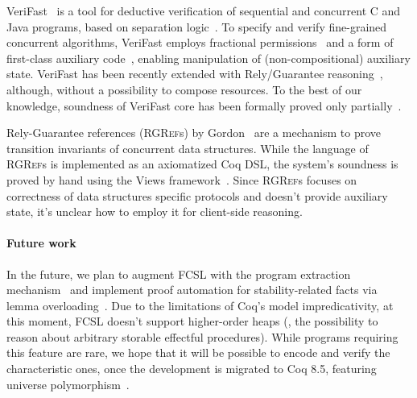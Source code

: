 VeriFast~\cite{Jacobs-al:NFM11} is a tool for deductive verification
of sequential and concurrent C and Java programs, based on separation
logic~\cite{Reynolds:LICS02}.
% 
%
To specify and verify fine-grained concurrent algorithms, VeriFast
employs fractional permissions~\cite{Bornat-al:POPL05} and a form of
first-class auxiliary code~\cite{Jacobs-Piessens:POPL11}, enabling
manipulation of (non-compositional) auxiliary state. VeriFast has been
recently extended with Rely/Guarantee
reasoning~\cite{Jacobs-al:sharedboxes}, although, without a
possibility to compose resources. To the best of our knowledge,
soundness of VeriFast core has been formally proved only
partially~\cite{Vogels:PhD}.




Rely-Guarantee references (\textsc{RGRef}s) by Gordon~\cite{Gordon:PhD} are
a mechanism to prove transition invariants of concurrent data
structures.
%
%
While the language of \textsc{RGRef}s is implemented as an axiomatized
Coq DSL, the system's soundness is proved by hand using the Views
framework~\cite{DinsdaleYoung-al:POPL13}.
%
Since \textsc{RGRef}s focuses on correctness of data structures \wrt
specific protocols and doesn't provide auxiliary state, it's unclear
how to employ it for client-side reasoning.

\paragraph{Future work}
\label{sec:future-work}
%
In the future, we plan to augment FCSL with the program extraction
mechanism~\cite{Letouzey:CIE08} and implement proof automation for
stability-related facts via lemma
overloading~\cite{Gonthier-al:ICFP11}.
%
Due to the limitations of Coq's model \wrt impredicativity, at this
moment, FCSL doesn't support higher-order heaps (\ie, the possibility
to reason about arbitrary storable effectful procedures). While programs
requiring this feature are rare, we hope that it will be possible to
encode and verify the characteristic ones, once the development is
migrated to Coq 8.5, featuring universe
polymorphism~\cite{Sozeau-Tabareau:ITP14}.
